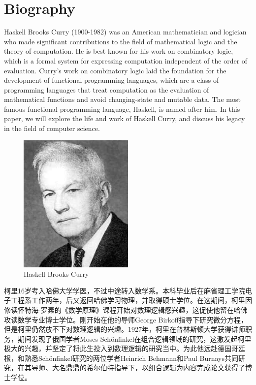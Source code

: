 \section{Biography}

Haskell Brooks Curry\cite{enwiki:1192145129} (1900-1982) was an American mathematician and logician who made significant contributions to the field of mathematical logic and the theory of computation. He is best known for his work on combinatory logic, which is a formal system for expressing computation independent of the order of evaluation. Curry's work on combinatory logic laid the foundation for the development of functional programming languages, which are a class of programming languages that treat computation as the evaluation of mathematical functions and avoid changing-state and mutable data. The most famous functional programming language, Haskell, is named after him. In this paper, we will explore the life and work of Haskell Curry, and discuss his legacy in the field of computer science.

\begin{figure}[H]
    \centering
    \includegraphics[width=0.5\textwidth]{figures/curry.jpg}
    \caption{Haskell Brooks Curry}
    \label{fig:curry}
\end{figure}




柯里16岁考入哈佛大学学医，不过中途转入数学系。本科毕业后在麻省理工学院电子工程系工作两年，后又返回哈佛学习物理，并取得硕士学位。在这期间，柯里因修读怀特海-罗素的《数学原理》课程开始对数理逻辑感兴趣，这促使他留在哈佛攻读数学专业博士学位。刚开始在他的导师George Birkoff指导下研究微分方程，但是柯里仍然放不下对数理逻辑的兴趣。1927年，柯里在普林斯顿大学获得讲师职务，期间发现了俄国学者Moses Schönfinkel在组合逻辑领域的研究，这激发起柯里极大的兴趣，并坚定了将此生投入到数理逻辑的研究当中。为此他远赴德国哥廷根，和熟悉Schönfinkel研究的两位学者Heinrich Behmann和Paul Burnays共同研究，在其导师、大名鼎鼎的希尔伯特指导下，以组合逻辑为内容完成论文获得了博士学位。

